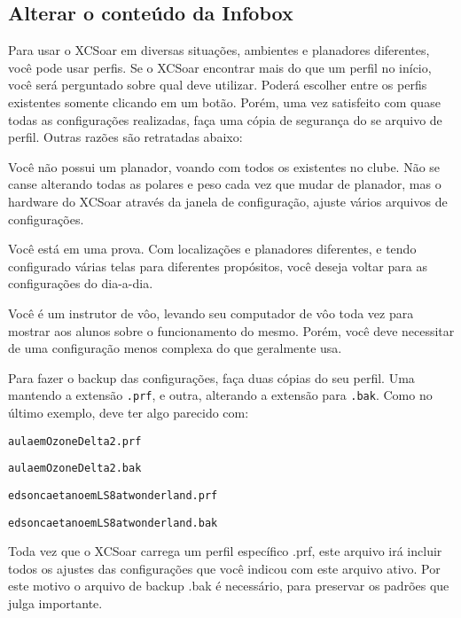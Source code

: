 \documentclass[a4paper,12pt,utf8]{scrreprt}
\begin{document}
\subsection{\textcolor{flashblue}{Alterar o conteúdo da Infobox}}
Para usar o XCSoar em diversas situações, ambientes e planadores diferentes, você pode usar perfis.  Se o XCSoar encontrar mais do que um perfil no início, você será perguntado sobre qual deve utilizar.  Poderá escolher entre os perfis existentes somente clicando em um botão.  Porém, uma vez satisfeito com quase todas as configurações realizadas, faça uma cópia de segurança do se arquivo de perfil.  Outras razões são retratadas abaixo:
\begin{compactitem}
\item Você não possui um planador, voando com todos os existentes no clube.  Não se canse alterando todas as polares e peso cada vez que mudar de planador, mas o hardware do XCSoar através da janela de configuração, ajuste vários arquivos de configurações.
\item Você está em uma prova.  Com localizações e planadores diferentes, e tendo configurado várias telas para diferentes propósitos, você deseja voltar para as configurações do dia-a-dia.
\item Você é um instrutor de vôo, levando seu computador de vôo toda vez para mostrar aos alunos sobre o funcionamento do mesmo.  Porém, você deve necessitar de uma configuração menos complexa do que geralmente usa.
\end{compactitem}
Para fazer o backup das configurações, faça duas cópias do seu perfil.  Uma mantendo a extensão \verb+.prf+, e outra, alterando a extensão para \verb+.bak+. Como no último exemplo, deve ter algo parecido com:
\begin{compactitem}
\item\verb+aulaemOzoneDelta2.prf+
\item\verb+aulaemOzoneDelta2.bak+
\item\verb+edsoncaetanoemLS8atwonderland.prf+
\item\verb+edsoncaetanoemLS8atwonderland.bak+
\end{compactitem}
Toda vez que o XCSoar carrega um perfil específico .prf, este arquivo irá incluir todos os ajustes das configurações que você indicou com este arquivo ativo.  Por este motivo o arquivo de backup .bak é necessário, para preservar os padrões que julga importante.
\end{document}
